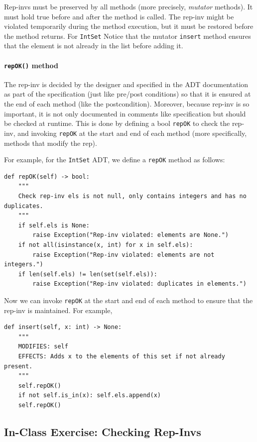 \documentclass[oneside,11pt,dvipsnames]{book}
\newcommand{\code}[1]{\texttt{#1}}
\begin{document}
Rep-invs must be preserved by all methods (more precisely, \emph{mutator} methods). It must hold true before and after the method is called. The rep-inv might be violated temporarily during the method execution, but it must be restored before the method returns. For \code{IntSet} Notice that the mutator \code{insert} method ensures that the element is not already in the list before adding it. 

\paragraph{\code{repOK()} method} The rep-inv is decided by the designer and specified in the ADT documentation as part of the specification (just like pre/post conditions) so that it is ensured at the end of each method (like the postcondition). Moreover, because rep-inv is so important, it is not only documented in comments like specification but should be checked at runtime.  This is done by defining a bool \code{repOK} to check the rep-inv, and invoking \code{repOK} at the start and end of each method (more specifically, methods that modify the rep).

For example, for the \code{IntSet} ADT, we define a \code{repOK} method as follows:

\begin{lstlisting}
def repOK(self) -> bool:
    """
    Check rep-inv els is not null, only contains integers and has no duplicates.
    """
    if self.els is None:
        raise Exception("Rep-inv violated: elements are None.")
    if not all(isinstance(x, int) for x in self.els):
        raise Exception("Rep-inv violated: elements are not integers.")
    if len(self.els) != len(set(self.els)):
        raise Exception("Rep-inv violated: duplicates in elements.")    
\end{lstlisting}

Now we can invoke \code{repOK} at the start and end of each method to ensure that the rep-inv is maintained. For example, 

\begin{lstlisting}
def insert(self, x: int) -> None:
    """
    MODIFIES: self
    EFFECTS: Adds x to the elements of this set if not already present.
    """
    self.repOK()
    if not self.is_in(x): self.els.append(x)
    self.repOK()
\end{lstlisting}


\subsection{In-Class Exercise: Checking Rep-Invs}\label{exercise:check-rep-invs}
\end{document}
